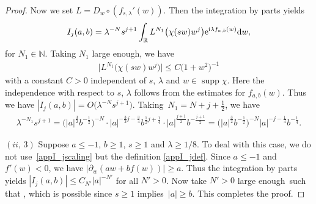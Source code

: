 \documentclass[pdftex]{sigma}
\numberwithin{equation}{section}
\def\R{\mathbb{R}}%
\DeclareMathOperator{\supp}{supp}%
\def\l{\lambda}
\def\pa{\partial}
\begin{document}
\begin{proof}
Now we set $L=D_w\circ(f_{s,\l}'(w))$. Then the integration by parts yields
\begin{align*}
I_j(a,b)= \l^{-N}s^{j+1}\int_{\R}L^{N_1}\bigl(\chi(sw)w^j\bigr){\rm e}^{{\rm i}\l f_{a,b}(w)}{\rm d}w,
\end{align*}
for $N_1\in\mathbb{N}$. Taking $N_1$ large enough, we have
\begin{align*}
\big|L^{N_1}\bigl(\chi(sw)w^j\bigr)\big|\leq C\bigl(1+w^2\bigr)^{-1}
\end{align*}
with a constant $C>0$ independent of $s$, $\l$ and $w\in \supp \chi$. Here the independence with respect to $s$, $\l$ follows from the estimates for $f_{a,b}(w)$. Thus we have $|I_j(a,b)|=O\bigl(\l^{-N}s^{j+1}\bigr)$.
Taking~${N_1=N+j+\frac{1}{2}}$, we have
\begin{align*}
\l^{-N_1}s^{j+1}=\bigl(|a|^{\frac{3}{2}}b^{-\frac{1}{2}}\bigr)^{-N}\cdot |a|^{-\frac{3}{2}j-\frac{3}{4}}b^{\frac{1}{2}j+\frac{1}{4}} \cdot |a|^{\frac{j+1}{2}}b^{-\frac{j+1}{2}}=\bigl(|a|^{\frac{3}{2}}b^{-\frac{1}{2}}\bigr)^{-N}|a|^{-j-\frac{1}{4}}b^{-\frac{1}{4}}.
\end{align*}

 $(ii,\,3)$ Suppose $a\leq -1$, $b\geq 1$, $s\geq 1$ and $\l\geq 1/8$. To deal with this case, we do not use~\eqref{appI_jscaling} but the definition \eqref{appI_jdef}. Since $a\leq -1$ and $f'(w)<0$, we have $|\pa_w(aw+bf(w))|\geq a$. Thus the integration by parts yields $|I_j(a,b)|\leq C_{N'}|a|^{-N'}$ for all $N'>0$. Now take $N'>0$ large enough~such that , which is possible since $s\geq 1$ implies~${|a|\geq b}$. This completes the proof.
\end{proof}
\end{document}
